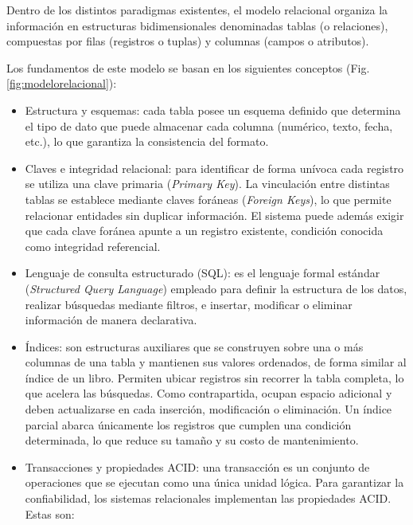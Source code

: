 
Dentro de los distintos paradigmas existentes, el modelo relacional organiza la información en estructuras bidimensionales denominadas tablas (o relaciones), compuestas por filas (registros o tuplas) y columnas (campos o atributos).

Los fundamentos de este modelo se basan en los siguientes conceptos (Fig. \ref{fig:modelorelacional}):

\begin{itemize}
    \item Estructura y esquemas: cada tabla posee un esquema definido que determina el tipo de dato que puede almacenar cada columna (numérico, texto, fecha, etc.), lo que garantiza la consistencia del formato.
    \item Claves e integridad relacional: para identificar de forma unívoca cada registro se utiliza una clave primaria (\emph{Primary Key}). La vinculación entre distintas tablas se establece mediante claves foráneas (\emph{Foreign Keys}), lo que permite relacionar entidades sin duplicar información. El sistema puede además exigir que cada clave foránea apunte a un registro existente, condición conocida como integridad referencial. 
    \item Lenguaje de consulta estructurado (SQL): es el lenguaje formal estándar (\emph{Structured Query Language}) empleado para definir la estructura de los datos, realizar búsquedas mediante filtros, e insertar, modificar o eliminar información de manera declarativa.
    \item Índices: son estructuras auxiliares que se construyen sobre una o más columnas de una tabla y mantienen sus valores ordenados, de forma similar al índice de un libro. Permiten ubicar registros sin recorrer la tabla completa, lo que acelera las búsquedas. Como contrapartida, ocupan espacio adicional y deben actualizarse en cada inserción, modificación o eliminación. Un índice parcial abarca únicamente los registros que cumplen una condición determinada, lo que reduce su tamaño y su costo de mantenimiento.
    \item Transacciones y propiedades ACID: una transacción es un conjunto de operaciones que se ejecutan como una única unidad lógica. Para garantizar la confiabilidad, los sistemas relacionales implementan las propiedades ACID. Estas son:


\end{itemize}
